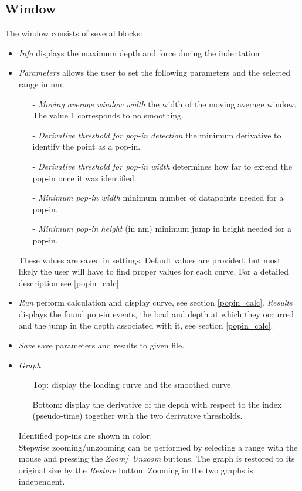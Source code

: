 \subsection{Window}
The window consists of several blocks:
\begin{itemize}
 \item \emph{Info} displays the maximum depth and force during the indentation
 \item \emph{Parameters} allows the user to set the following parameters and the selected range in nm. 
        \begin{itemize}
          \item[-] \emph{Moving average window width} the width of the moving average window. The value 1 corresponds to no smoothing.
          \item[-] \emph{Derivative threshold for pop-in detection} the minimum derivative to identify the point as a pop-in.
          \item[-] \emph{Derivative threshold for pop-in width} determines how far to extend the pop-in once it was identified.
          \item[-] \emph{Minimum pop-in width} minimum number of datapoints needed for a pop-in.
          \item[-] \emph{Minimum pop-in height} (in nm) minimum jump in height needed for a pop-in.
        \end{itemize}
        These values are saved in settings. Default values are provided, but most likely the user will have to find proper values for each curve. For a detailed description see \ref{popin_calc}
       
  \item \emph{Run}  perform calculation and display curve, see section \ref{popin_calc}. 
  \emph{Results} displays the found pop-in events, the load and depth at which they occurred and the jump in the depth associated with it, see section \ref{popin_calc}.
 \item \emph{Save} save parameters and results to given file. 
 \item \emph{Graph}  
    \begin{itemize} \item[] Top: display the loading curve and the smoothed curve. 
       \item[] Bottom: display the derivative of the depth with respect to the index (pseudo-time) together with the two derivative thresholds.
  \end{itemize}
  Identified pop-ins are shown in color. \\
  Stepwise zooming/unzooming can be performed by selecting a range with the mouse and pressing the \emph{Zoom}/ \emph{Unzoom} buttons. 
		     The graph is restored to its original size by the \emph{Restore} button. Zooming in the two graphs is independent.
\end{itemize}

